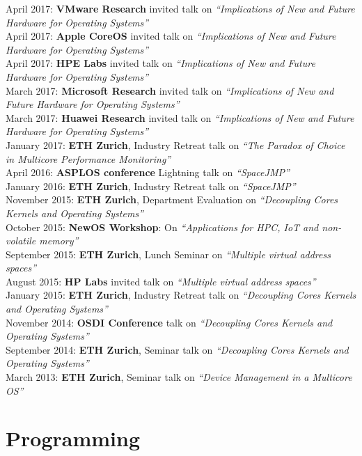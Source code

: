 \documentclass[margin,line]{resume}
\begin{document}
\begin{resume}
April 2017: \textbf{VMware Research} invited talk on \textit{``Implications of New and Future Hardware for Operating Systems''}\\
April 2017: \textbf{Apple CoreOS} invited talk on \textit{``Implications of New and Future Hardware for Operating Systems''}\\
April 2017: \textbf{HPE Labs} invited talk on \textit{``Implications of New and Future Hardware for Operating Systems''}\\
March 2017: \textbf{Microsoft Research} invited talk on \textit{``Implications of New and Future Hardware for Operating Systems''}\\
March 2017: \textbf{Huawei Research} invited talk on \textit{``Implications of New and Future Hardware for Operating Systems''}\\
January 2017: \textbf{ETH Zurich}, Industry Retreat talk on \textit{``The Paradox of Choice in Multicore Performance Monitoring''}\\
April 2016: \textbf{ASPLOS conference} Lightning talk on \textit{``SpaceJMP''}\\
January 2016: \textbf{ETH Zurich}, Industry Retreat talk on \textit{``SpaceJMP''}\\
November 2015: \textbf{ETH Zurich}, Department Evaluation on \textit{``Decoupling Cores Kernels and Operating Systems''}\\
October 2015: \textbf{NewOS Workshop}: On \textit{``Applications for HPC, IoT and non-volatile memory''}\\
September 2015: \textbf{ETH Zurich}, Lunch Seminar on \textit{``Multiple virtual address spaces''}\\
August 2015: \textbf{HP Labs} invited talk on \textit{``Multiple virtual address spaces''}\\
January 2015: \textbf{ETH Zurich}, Industry Retreat talk on \textit{``Decoupling Cores Kernels and Operating Systems''}\\
November 2014: \textbf{OSDI Conference} talk on \textit{``Decoupling Cores Kernels and Operating Systems''}\\
September 2014: \textbf{ETH Zurich}, Seminar talk on \textit{``Decoupling Cores Kernels and Operating Systems''}\\
March 2013: \textbf{ETH Zurich}, Seminar talk on \textit{``Device Management in a Multicore OS''}\\

\section{\mysidestyle Programming}


\end{resume}
\end{document}
